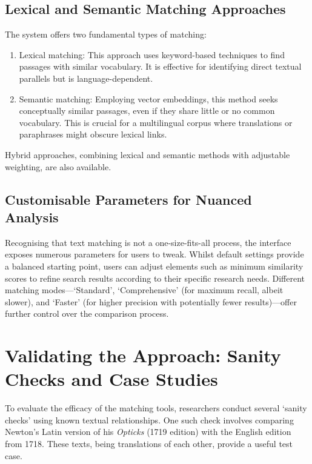 \documentclass[
  letterpaper,
]{book}
\begin{document}
\subsection{Lexical and Semantic Matching
Approaches}\label{lexical-and-semantic-matching-approaches}

The system offers two fundamental types of matching:

\begin{enumerate}
\def\labelenumi{\arabic{enumi}.}
\item
  Lexical matching: This approach uses keyword-based techniques to find
  passages with similar vocabulary. It is effective for identifying
  direct textual parallels but is language-dependent.
\item
  Semantic matching: Employing vector embeddings, this method seeks
  conceptually similar passages, even if they share little or no common
  vocabulary. This is crucial for a multilingual corpus where
  translations or paraphrases might obscure lexical links.
\end{enumerate}

Hybrid approaches, combining lexical and semantic methods with
adjustable weighting, are also available.

\subsection{Customisable Parameters for Nuanced
Analysis}\label{customisable-parameters-for-nuanced-analysis}

Recognising that text matching is not a one-size-fits-all process, the
interface exposes numerous parameters for users to tweak. Whilst default
settings provide a balanced starting point, users can adjust elements
such as minimum similarity scores to refine search results according to
their specific research needs. Different matching modes---`Standard',
`Comprehensive' (for maximum recall, albeit slower), and `Faster' (for
higher precision with potentially fewer results)---offer further control
over the comparison process.

\section{Validating the Approach: Sanity Checks and Case
Studies}\label{validating-the-approach-sanity-checks-and-case-studies}

To evaluate the efficacy of the matching tools, researchers conduct
several `sanity checks' using known textual relationships. One such
check involves comparing Newton's Latin version of his \emph{Opticks}
(1719 edition) with the English edition from 1718. These texts, being
translations of each other, provide a useful test case.
\end{document}
